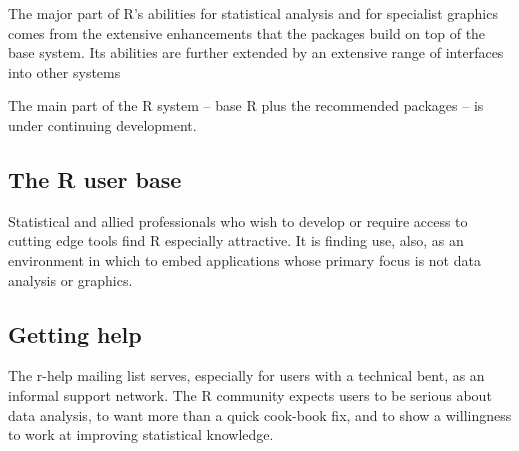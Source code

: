 The major part of R's abilities for statistical analysis
and for specialist graphics comes from the extensive enhancements that
the packages build on top of the base system.  Its abilities are
further extended by an extensive range of interfaces into
other systems

The main part of the R system -- base R plus the recommended packages
-- is under continuing development.
\subsection*{The R user base}

Statistical and allied professionals who wish to
develop or require access to cutting edge tools find R especially
attractive.  It is finding use, also, as an environment in which to
embed applications whose primary focus is not data analysis or
graphics.

\subsection*{Getting help}

\begin{fullwidth}
\end{fullwidth}
\vspace*{8pt}

The r-help mailing list  serves, especially
for users with a technical bent, as an informal support network.  The
R community expects users to be serious about data analysis, to want
more than a quick cook-book fix, and to show a willingness to work at
improving statistical knowledge.


